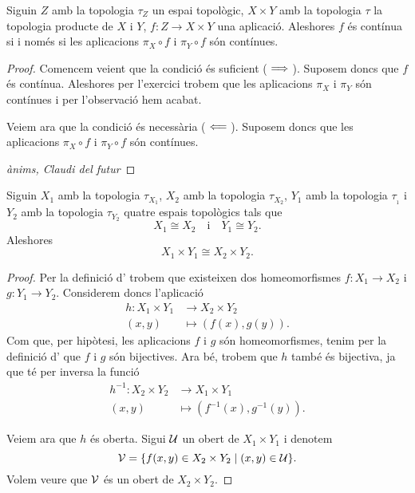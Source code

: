 \documentclass[../Apunts.tex]{subfiles}
\begin{document}
	\begin{theorem}
		\label{thm:una aplicació és contínua si i només si les seves components són contínues}
		Siguin \(Z\) amb la topologia \(\tau_{Z}\) un espai topològic, \(X\times Y\) amb la topologia \(\tau\) la topologia producte de \(X\) i \(Y\), \(f\colon Z\longrightarrow X\times Y\) una aplicació. Aleshores \(f\) és contínua si i només si les aplicacions \(\pi_{X}\circ f\) i \(\pi_{Y}\circ f\) són contínues.
		\begin{proof}
			Comencem veient que la condició és suficient (\(\implies\)). Suposem doncs que \(f\) és contínua. Aleshores per l'exercici  trobem que les aplicacions \(\pi_{X}\) i \(\pi_{Y}\) són contínues i per l'observació  hem acabat.
			
			Veiem ara que la condició és necessària (\(\impliedby\)). Suposem doncs que les aplicacions \(\pi_{X}\circ f\) i \(\pi_{Y}\circ f\) són contínues.
			
			\emph{ànims, Claudi del futur} %
		\end{proof}
	\end{theorem}
	\begin{proposition}
		Siguin \(X_{1}\) amb la topologia \(\tau_{X_{1}}\),  \(X_{2}\) amb la topologia \(\tau_{X_{2}}\), \(Y_{1}\) amb la topologia \(\tau_{_{1}}\) i \(Y_{2}\) amb la topologia \(\tau_{Y_{2}}\) quatre espais topològics tals que
		\[X_{1}\cong X_{2}\quad\text{i}\quad Y_{1}\cong Y_{2}.\]
		Aleshores
		\[X_{1}\times Y_{1}\cong X_{2}\times Y_{2}.\]
		\begin{proof}
			Per la definició d' trobem que existeixen dos homeomorfismes \(f\colon X_{1}\longrightarrow X_{2}\) i \(g\colon Y_{1}\longrightarrow Y_{2}\). Considerem doncs l'aplicació
			\begin{align*}
				h\colon X_{1}\times Y_{1}&\longrightarrow X_{2}\times Y_{2} \\
				(x,y)&\longmapsto(f(x),g(y)).
			\end{align*}
			Com que, per hipòtesi, les aplicacions \(f\) i \(g\) són homeomorfismes, tenim per la definició d' que \(f\) i \(g\) són bijectives. Ara bé, trobem que \(h\) també és bijectiva, ja que té per inversa la funció
			\begin{align*}
				h^{-1}\colon X_{2}\times Y_{2}&\longrightarrow X_{1}\times Y_{1} \\
				(x,y)&\longmapsto(f^{-1}(x),g^{-1}(y)).
			\end{align*}
			
			Veiem ara que \(h\) és oberta. Sigui \(\mathcal{U}\) un obert de \(X_{1}\times Y_{1}\) i denotem
			\[\mathcal{V}=\{f(x,y)\in X_{2}\times Y_{2}\mid(x,y)\in\mathcal{U}\}.\]
			Volem veure que \(\mathcal{V}\) és un obert de \(X_{2}\times Y_{2}\).
		\end{proof}
	\end{proposition}
\end{document}
